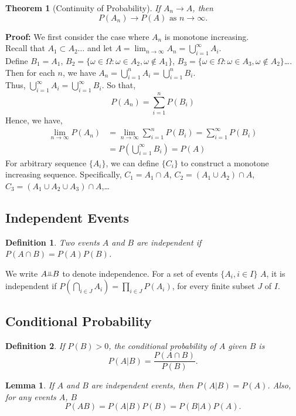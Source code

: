 \documentclass[11pt]{article}
\newtheorem{theorem}{Theorem}[section]
\newtheorem{lemma}{Lemma}[section]
\newtheorem{definition}{Definition}[section]
\def\probin{\mbox{\rotatebox[origin=c]{90}{$\vDash$}}}
\begin{document}
\begin{theorem}[Continuity of Probability]
If $A_n \rightarrow A$, then
\[ P(A_n) \rightarrow P(A) \text{ as } n\rightarrow \infty. \]
\end{theorem}
{\bf Proof: } We first consider the case where $A_n$ is monotone increasing.\\
Recall that $A_1\subset A_2\dots$ and let $A = \lim_{n\rightarrow \infty}A_n = \bigcup_{i = 1}^{\infty}A_i$.\\
Define $B_1 = A_1$, $B_2 = \{ \omega \in \Omega : \omega \in A_2, \omega \notin A_1\}$,
$B_3 = \{ \omega \in \Omega : \omega \in A_3, \omega \notin A_2\}$\dots.
Then for each $n$, we have $A_n = \bigcup_{i=1}^{n}A_i = \bigcup_{i=1}^{n}B_i$.\\
Thus, $\bigcup_{i=1}^{\infty}A_i = \bigcup_{i=1}^{\infty}B_i$. So that,
\[P(A_n) = \sum_{i=1}^n P(B_i)\]
Hence, we have,
\begin{align}\nonumber
\lim_{n\rightarrow\infty}P(A_n) & = \lim_{n\rightarrow\infty}\sum_{i=1}^n P(B_i) = \sum_{i=1}^{\infty}P(B_i)\\
& = P(\bigcup_{i=1}^{\infty}B_i) = P(A)\nonumber
\end{align}
For arbitrary sequence $\{A_i\}$, we can define $\{C_i\}$ to construct a monotone increasing sequence.
Specifically,
$C_1 = A_1 \cap A$,
$C_2 = (A_1 \cup A_2) \cap A$,
$C_3 = (A_1 \cup A_2 \cup A_3) \cap A$,\dots


\subsection{Independent Events}
\begin{definition}
Two events $A$ and $B$ are independent if $P(A\cap B) = P(A)P(B)$.
\end{definition}
We write $A \probin B$ to denote independence. For a set of events $\{A_i, i\in I\}$ $A$, it is
independent if $P(\bigcap_{i\in J}A_i) = \prod_{i\in J}P(A_i)$, for
every finite subset $J$ of $I$.

\subsection{Conditional Probability}
\begin{definition}
If $P(B) > 0$, the conditional probability of $A$ given $B$ is
\[P(A|B) = \frac{P(A\cap B)}{P(B)}.\]
\end{definition}

\begin{lemma}
If $A$ and $B$ are independent events, then $P(A|B) = P(A)$. Also, for any events $A$, $B$
\[P(AB) = P(A|B)P(B) = P(B|A)P(A).\]
\end{lemma}
\end{document}

